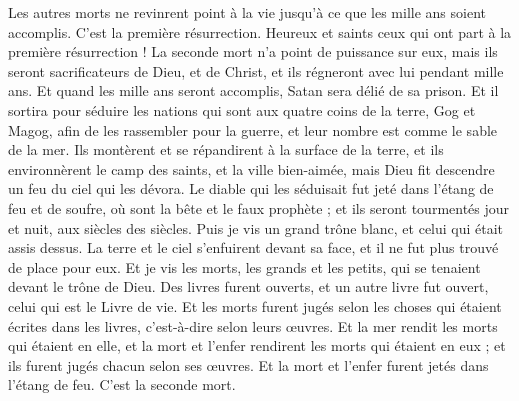 \begin{multicols}{2}
Les autres morts ne revinrent point à la vie jusqu'à ce que les mille ans soient accomplis. C'est la première résurrection.
Heureux et saints ceux qui ont part à la première résurrection ! La seconde mort n'a point de puissance sur eux, mais ils seront sacrificateurs de Dieu, et de Christ, et ils régneront avec lui pendant mille ans.
Et quand les mille ans seront accomplis, Satan sera délié de sa prison.
Et il sortira pour séduire les nations qui sont aux quatre coins de la terre, Gog et Magog, afin de les rassembler pour la guerre, et leur nombre est comme le sable de la mer.
Ils montèrent et se répandirent à la surface de la terre, et ils environnèrent le camp des saints, et la ville bien-aimée, mais Dieu fit descendre un feu du ciel qui les dévora.
Le diable qui les séduisait fut jeté dans l'étang de feu et de soufre, où sont la bête et le faux prophète ; et ils seront tourmentés jour et nuit, aux siècles des siècles.
Puis je vis un grand trône blanc, et celui qui était assis dessus. La terre et le ciel s’enfuirent devant sa face, et il ne fut plus trouvé de place pour eux.
Et je vis les morts, les grands et les petits, qui se tenaient devant le trône de Dieu. Des livres furent ouverts, et un autre livre fut ouvert, celui qui est le Livre de vie. Et les morts furent jugés selon les choses qui étaient écrites dans les livres, c'est-à-dire selon leurs œuvres.
Et la mer rendit les morts qui étaient en elle, et la mort et l'enfer rendirent les morts qui étaient en eux ; et ils furent jugés chacun selon ses œuvres.
Et la mort et l'enfer furent jetés dans l'étang de feu{}. C'est la seconde mort.

\end{multicols}
